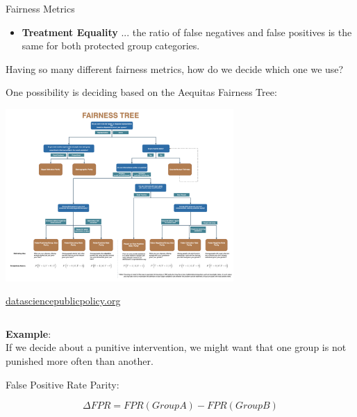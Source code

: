 \begin{vbframe}{Fairness Metrics}
\begin{footnotesize}
\begin{itemize}
\item \textbf{Treatment Equality}
... the ratio of false negatives and false positives is the same for both protected group categories.

\end{itemize}
\end{footnotesize}
\framebreak

Having so many different fairness metrics, how do we decide which one we use? 

One possibility is deciding based on the Aequitas Fairness Tree: 

    \begin{center}
    \includegraphics[width=0.65\textwidth]{figure_man/fair-aequitas-tree.png}\\
      \begin{tiny}
    \href{http://www.datasciencepublicpolicy.org/projects/aequitas/}{datasciencepublicpolicy.org}
    \end{tiny}
    \end{center}

\framebreak
\null
\vfill
\begin{columns}
\begin{column}{0.5\textwidth}
\null
\vfill
\textbf{Example}: \\

If we decide about a punitive intervention, we might want that one group is not punished more often than another. 
\newline

False Positive Rate Parity:
\begin{footnotesize}
$$
\Delta FPR = FPR(Group A) - FPR(Group B)
$$
\end{footnotesize}


\end{column}
\end{columns}
\end{vbframe}
